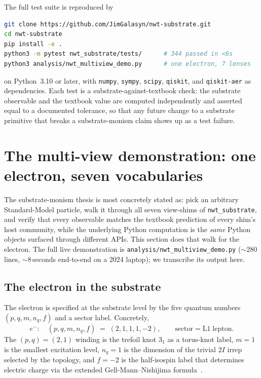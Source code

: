 \documentclass[11pt]{article}
\newcommand{\nwtsub}{\texttt{nwt\_substrate}}
\begin{document}
The full test suite is reproduced by
\begin{lstlisting}[language=bash]
git clone https://github.com/JimGalasyn/nwt-substrate.git
cd nwt-substrate
pip install -e .
python3 -m pytest nwt_substrate/tests/      # 344 passed in <6s
python3 analysis/nwt_multiview_demo.py      # one electron, 7 lenses
\end{lstlisting}
on Python~3.10 or later, with \texttt{numpy}, \texttt{sympy},
\texttt{scipy}, \texttt{qiskit}, and \texttt{qiskit-aer} as
dependencies.  Each test is a substrate-against-textbook check:
the substrate observable and the textbook value are computed
independently and asserted equal to a documented tolerance, so
that any future change to a substrate primitive that breaks a
substrate-monism claim shows up as a test failure.

\section{The multi-view demonstration: one electron, seven vocabularies}
\label{sec:multiview}

The substrate-monism thesis is most concretely stated as: pick an
arbitrary Standard-Model particle, walk it through all seven
view-shims of \nwtsub{}, and verify that every observable matches
the textbook prediction of every shim's host community, while the
underlying Python computation is the \emph{same} Python objects
surfaced through different APIs.  This section does that walk for
the electron.  The full live demonstration is
\texttt{analysis/nwt\_multiview\_demo.py} ($\sim$280 lines,
$\sim$8\,seconds end-to-end on a 2024 laptop); we transcribe its
output here.

\subsection{The electron in the substrate}

The electron is specified at the substrate level by the five
quantum numbers $(p, q, m, n_q, f)$ and a sector label.  Concretely,
\begin{equation}
  e^- :\quad (p, q, m, n_q, f) \;=\; (2, 1, 1, 1, -2),
  \qquad \text{sector} = \mathrm{L1\;lepton}.
\end{equation}
The $(p, q) = (2, 1)$ winding is the trefoil knot
$3_1$ as a torus-knot label, $m = 1$ is the smallest excitation
level, $n_q = 1$ is the dimension of the trivial $2I$ irrep
selected by the topology, and $f = -2$ is the half-isospin label
that determines electric charge via the extended
Gell-Mann--Nishijima formula~\cite{paper6}.
\end{document}
